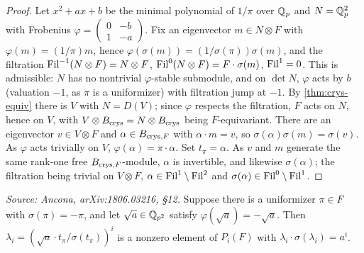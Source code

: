 \begin{proof}
  Let \(x^2 + ax + b\) be the minimal polynomial of \(1/\pi\) over \(\mathbb{Q}_p\) and
  \(N = \mathbb{Q}_p^2\) with Frobenius
  \(\varphi = \left(\begin{smallmatrix} 0 & -b \\ 1 & -a \end{smallmatrix}\right)\).
  Fix an eigenvector \(m \in N \otimes F\) with \(\varphi(m) = (1/\pi)m\), hence
  \(\varphi(\sigma(m)) = (1/\sigma(\pi))\sigma(m)\), and the filtration
  \(\mathrm{Fil}^{-1}(N \otimes F) = N \otimes F\), \(\mathrm{Fil}^0(N \otimes F) = F \cdot
  \sigma(m)\), \(\mathrm{Fil}^1 = 0\). This is admissible: \(N\) has no nontrivial
  \(\varphi\)-stable submodule, and on \(\det N\), \(\varphi\) acts by \(b\)
  (valuation \(-1\), as \(\pi\) is a uniformizer) with filtration jump at \(-1\).
  By \cref{thm:crys-equiv} there is \(V\) with \(N = D(V)\); since \(\varphi\)
  respects the filtration, \(F\) acts on \(N\), hence on \(V\), with
  \(V \otimes B_{\mathrm{crys}} = N \otimes B_{\mathrm{crys}}\) being \(F\)-equivariant. There are an
  eigenvector \(v \in V \otimes F\) and \(\alpha \in B_{\mathrm{crys},F}\) with
  \(\alpha \cdot m = v\), so \(\sigma(\alpha)\sigma(m) = \sigma(v)\). As
  \(\varphi\) acts trivially on \(V\), \(\varphi(\alpha) = \pi \cdot \alpha\). Set
  \(t_\pi = \alpha\). As \(v\) and \(m\) generate the same rank-one free
  \(B_{\mathrm{crys},F}\)-module, \(\alpha\) is invertible, and likewise
  \(\sigma(\alpha)\); the filtration being trivial on \(V \otimes F\),
  \(\alpha \in \mathrm{Fil}^1 \setminus \mathrm{Fil}^2\) and \(\sigma(\alpha) \in \mathrm{Fil}^0
  \setminus \mathrm{Fil}^1\).
\end{proof}

\begin{corollary}
  \label{cor:period-ram}
  \textit{Source: Ancona, arXiv:1806.03216, \S12.}
  Suppose there is a uniformizer \(\pi \in F\) with \(\sigma(\pi) = -\pi\), and
  let \(\sqrt{a} \in \mathbb{Q}_{p^2}\) satisfy \(\varphi(\sqrt{a}) = -\sqrt{a}\). Then
  \(\lambda_i = (\sqrt{a} \cdot t_\pi/\sigma(t_\pi))^i\) is a nonzero element of
  \(P_i(F)\) with \(\lambda_i \cdot \sigma(\lambda_i) = a^i\).
\end{corollary}

